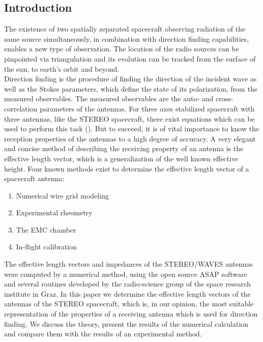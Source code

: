 \documentclass[galley,ras]{agu2001}
\begin{document}
\begin{article}

%
%

\section{Introduction}
The existence of two spatially separated spacecraft observing radiation of the same source simultaneously,
 in combination with direction finding capabilities, enables a new type of observation. The location of
  the radio sources can be pinpointed via triangulation and its evolution can be tracked from the surface
 of the sun, to earth's orbit and beyond.\\

Direction finding is the procedure of finding the direction of the incident wave as well as the Stokes parameters,
 which define the state of its polarization, from the measured observables. The measured observables are the auto-
  and cross-correlation parameters of the antennas. For three axes stabilized spacecraft with three antennas,
 like the STEREO spacecraft, there exist equations which can be used to perform this task (\cite{cecconi05}).
  But to succeed, it is of vital importance to know the reception properties of the antennas to a high degree of
   accuracy. A very elegant and concise method of describing the receiving property of an antenna is the effective
  length vector, which is a generalization of the well known effective height. Four known methods exist to determine
 the effective length vector of a spacecraft antenna:\\

\begin{enumerate}
    \item Numerical wire grid modeling\\
\item Experimental rheometry\\
\item The EMC chamber\\
\item In-flight calibration\\
\end{enumerate}

The effective length vectors and impedances of the STEREO/WAVES antennas were computed by a numerical method, using the open source ASAP software and several routines developed by the radio-science group of the space research institute in Graz. In this paper we determine the effective length vectors of the antennas of the STEREO spacecraft, which is, in our opinion, the most suitable representation of the properties of a receiving antenna which is used for direction finding. We discuss the theory, present the results of the numerical calculation and compare them with the results of an experimental method.



\end{article}
\end{document}

